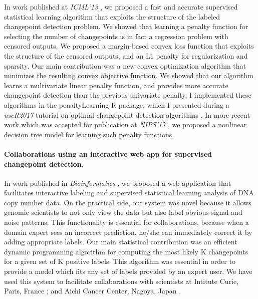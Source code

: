 \documentclass{article}
\begin{document}
In work published at \emph{ICML'13} \citep{HOCKING-penalties}, we
proposed a fast and accurate supervised statistical learning algorithm
that exploits the structure of the labeled changepoint detection
problem. We showed that learning a penalty function for selecting the
number of changepoints is in fact a regression problem with censored
outputs. 
We proposed a margin-based convex loss function that exploits the
structure of the censored outputs, and an L1 penalty for
regularization and sparsity. Our main contribution was a new convex
optimization algorithm that minimizes the resulting convex objective
function. We showed that our algorithm learns a multivariate linear
penalty function, and provides more accurate changepoint detection
than the previous univariate penalty. I implemented these algorithms
in the penaltyLearning R package, which I presented during a
\emph{useR2017} tutorial on optimal changepoint detection algorithms
\citep{change-tutorial}. In more recent work which was accepted for
publication at \emph{NIPS'17} \citep{MMIT}, we proposed a nonlinear
decision tree model for learning such penalty functions.

\paragraph{Collaborations using an interactive web app for supervised
  changepoint detection.} In work published in \emph{Bioinformatics}
\citep{hocking-SegAnnDB}, we proposed a web application that
facilitates interactive labeling and supervised statistical learning
analysis of DNA copy number data. On the practical side, our system
was novel because it allows genomic scientists to not only view the
data but also label obvious signal and noise patterns. This
functionality is essential for collaborations, because when a domain
expert sees an incorrect prediction, he/she can
immediately correct it by adding appropriate labels. Our main
statistical contribution was an efficient dynamic programming
algorithm for computing the most likely K changepoints for a given set
of K positive labels. This algorithm was essential in order to provide a model
which fits any set of labels provided by an expert user. We have used
this system to facilitate collaborations with scientists at Intitute
Curie, Paris, France \citep{Chicard}; and Aichi Cancer Center, Nagoya,
Japan \citep{Hocking-Leukemia-2016,m14:clonal}.
\end{document}
